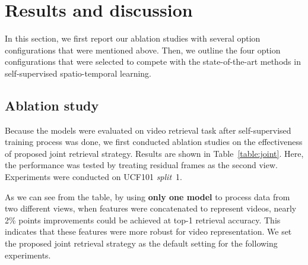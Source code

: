 \documentclass[sigconf]{acmart}
\begin{document}
\section{Results and discussion}
In this section, we first report our ablation studies with several option configurations that were mentioned above. Then, we outline the four option configurations that were selected to compete with the state-of-the-art methods in self-supervised spatio-temporal learning.

\subsection{Ablation study}
Because the models were evaluated on video retrieval task after self-supervised training process was done, we first conducted ablation studies on the effectiveness of proposed joint retrieval strategy. Results are shown in Table~\ref{table:joint}. Here, the performance was tested by treating residual frames as the second view. Experiments were conducted on UCF101 \textit{split}~1.

\begin{table}[tb]
\centering
  \caption{Effectiveness of joint retrieval.}
  \label{table:joint}
\end{table}

As we can see from the table, by using \textbf{only one model} to process data from two different views, when features were concatenated to represent videos, nearly 2\% points improvements could be achieved at top-1 retrieval accuracy. This indicates that these features were more robust for video representation. We set the proposed joint retrieval strategy as the default setting for the following experiments. 
\\
\end{document}
